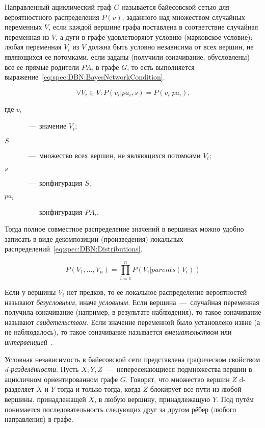 Направленный ациклический граф $G$ называется байесовской сетью для вероятностного распределения $P(v)$, заданного над множеством случайных переменных $V$, если каждой вершине графа поставлена в соответствие случайная переменная из $V$, а дуги в графе удовлетворяют условию (марковское условие): любая переменная $V_i$ из $V$ должна быть условно независима от всех вершин, не являющихся ее потомками, если заданы (получили означивание, обусловлены) все ее прямые родители $PA_i$ в графе $G$, то есть выполняется выражение~\eqref{eq:spec:DBN:BayesNetworkCondition}.

\begin{equation} \label{eq:spec:DBN:BayesNetworkCondition}
\forall V_i\in V: P(v_i|pa_i, s) = P(v_i|pa_i) \text{,}
\end{equation}
\begin{description}
	\item[где $v_i$]~---~значение $V_i$;
	\item[$S$]~---~множество всех вершин, не являющихся потомками $V_i$;
	\item[$s$]~---~конфигурация $S$;
	\item[$pa_i$]~---~конфигурация $PA_i$.
\end{description}

Тогда полное совместное распределение значений в вершинах можно удобно записать в виде декомпозиции (произведения) локальных распределений~\eqref{eq:spec:DBN:Distributions}.

\begin{equation} \label{eq:spec:DBN:Distributions}
P(V_1,\dots,V_n) = \prod_{i=1}^{n} P(V_i|parents(V_i))
\end{equation}

Если у вершины $V_i$ нет предков, то её локальное распределение вероятностей называют \textit{безусловным}, иначе \textit{условным}. Если вершина~---~случайная переменная получила означивание (например, в результате наблюдения), то такое означивание называют \textit{свидетельством}. Если значение переменной было установлено извне (а не наблюдалось), то такое означивание называется \textit{вмешательством} или \textit{интервенцией}~\cite{PearlDynamicBayesianNetworks}.

Условная независимость в байесовской сети представлена графическом свойством \textit{d-разделённости}. Пусть $X, Y, Z$~---~непересекающиеся подмножества вершин в ацикличном ориентированном графе $G$. Говорят, что множество вершин $Z$ d-разделяет $X$ и $Y$ тогда и только тогда, когда $Z$ блокирует все пути из любой вершины, принадлежащей $X$, в любую вершину, принадлежащую $Y$. Под путём понимается последовательность следующих друг за другом рёбер (любого направления) в графе.

